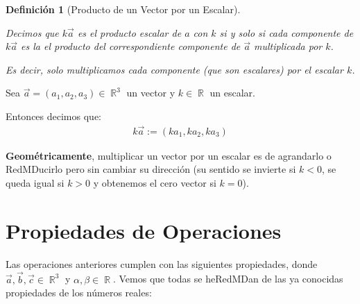 \documentclass[12pt, fleqn]{report}                             %
\newtheorem{Definition}{Definición}[section]                    %
\theoremstyle{break}                                            %
\DeclareMathOperator \Reals        {\mathbb{R}}                 %
\begin{document}
                \begin{Definition}[Producto de un Vector por un Escalar]
                    \label{DefProductoVectorEscalar}

                    Decimos que $k \vec{a}$ es el producto escalar de $a$ con $k$
                    si y solo si cada componente de $k \vec{a}$ es la el producto del correspondiente componente
                    de $\vec{a}$ multiplicada por $k$.

                    Es decir, solo multiplicamos cada componente (que son escalares) por el escalar $k$.

                \end{Definition}

                Sea $\vec{a}=(a_1, a_2, a_3) \in \Reals^3$ un vector y $k \in \Reals$ un escalar.
                
                Entonces decimos que:
                \begin{align}
                    k\vec{a} := (ka_1, ka_2, ka_3)
                \end{align}

                \textbf{Geométricamente}, multiplicar un vector por un escalar es de agrandarlo o RedMDucirlo pero
                sin cambiar su dirección (su sentido se invierte si $k < 0$, se queda igual si $k > 0$ y
                obtenemos el cero vector si $k = 0$).


  

        \clearpage
        \section{Propiedades de Operaciones}
        
            Las operaciones anteriores cumplen con las siguientes propiedades, donde
            $\vec{a},\vec{b}, \vec{c} \in \Reals^3$ y $\alpha, \beta \in \Reals$.
            Vemos que todas se heRedMDan de las ya conocidas propiedades de los números reales:
\end{document}
